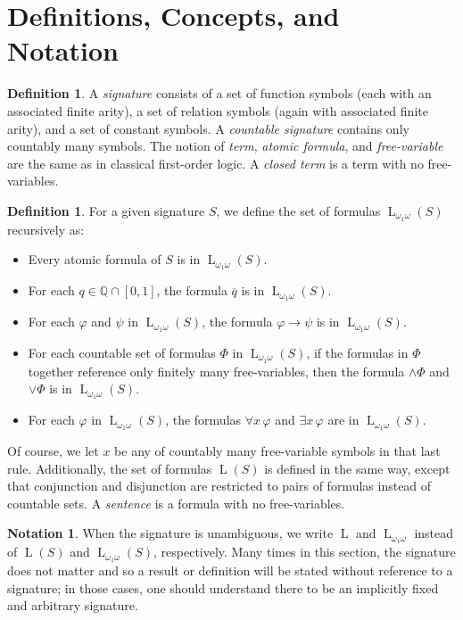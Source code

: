 \documentclass{amsart}
\theoremstyle{definition}
\newtheorem{definition}[theorem]{Definition}
\newtheorem{notation}[theorem]{Notation}
\numberwithin{equation}{theorem}
\renewcommand{\phi}{\varphi}
\newcommand{\Q}{\mathbb{Q}}
\newcommand{\unvee}{{\vee}}
\newcommand{\unwedge}{{\wedge}}
\newcommand{\rat}[1]{{\overline{#1}}}
\newcommand{\narrow}[1]{\xrightarrow{#1}}
\renewcommand{\to}{\narrow{}}
\newcommand{\baselang}{\operatorname{L}}
\newcommand{\lang}{\baselang_{\omega_1\omega}}
\begin{document}
\section{Definitions, Concepts, and Notation}
\begin{definition}
  A \emph{signature} consists of a set of function symbols (each with an associated finite arity), a set of relation symbols (again with associated finite arity), and a set of constant symbols.
  A \emph{countable signature} contains only countably many symbols.
  The notion of \emph{term}, \emph{atomic formula}, and \emph{free-variable} are the same as in classical first-order logic.
  A \emph{closed term} is a term with no free-variables.
\end{definition}
\begin{definition}
  For a given signature $S$, we define the set of formulas $\lang(S)$ recursively as:
  \begin{itemize}
  \item Every atomic formula of $S$ is in $\lang(S)$.
  \item For each $q\in\Q\cap[0,1]$, the formula $\rat q$ is in $\lang(S)$.
  \item For each $\phi$ and $\psi$ in $\lang(S)$, the formula $\phi\to\psi$ is in $\lang(S)$.
  \item For each countable set of formulas $\Phi$ in $\lang(S)$, if the formulas in $\Phi$ together reference only finitely many free-variables, then the formula $\unwedge\Phi$ and $\unvee\Phi$ is in $\lang(S)$.
  \item For each $\phi$ in $\lang(S)$, the formulas $\forall x\,\phi$ and $\exists x\,\phi$ are in $\lang(S)$.
  \end{itemize}
  Of course, we let $x$ be any of countably many free-variable symbols in that last rule.
  Additionally, the set of formulas $\baselang(S)$ is defined in the same way, except that conjunction and disjunction are restricted to pairs of formulas instead of countable sets.
  A \emph{sentence} is a formula with no free-variables.
\end{definition}
\begin{notation}
  When the signature is unambiguous, we write $\baselang$ and $\lang$ instead of $\baselang(S)$ and $\lang(S)$, respectively.
  Many times in this section, the signature does not matter and so a result or definition will be stated without reference to a signature; in those cases, one should understand there to be an implicitly fixed and arbitrary signature.
\end{notation}
\end{document}
